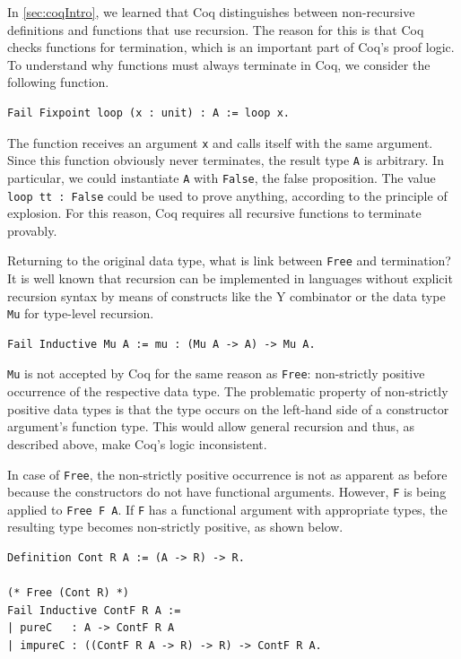 \documentclass[a4paper, 11pt, fleqn, twoside]{scrreprt}
\begin{document}
In \autoref{sec:coqIntro}, we learned that Coq distinguishes between non-recursive definitions and functions that use recursion.
The reason for this is that Coq checks functions for termination, which is an important part of Coq's proof logic.
To understand why functions must always terminate in Coq, we consider the following function.

\begin{verbatim}
Fail Fixpoint loop (x : unit) : A := loop x.
\end{verbatim}

The function receives an argument \texttt{x} and calls itself with the same argument.
Since this function obviously never terminates, the result type \texttt{A} is arbitrary.
In particular, we could instantiate \texttt{A} with \texttt{False}, the false proposition.
The value \texttt{loop tt : False} could be used to prove anything, according to the principle of explosion.
For this reason, Coq requires all recursive functions to terminate provably.

Returning to the original data type, what is link between \texttt{Free} and termination?
It is well known that recursion can be implemented in languages without explicit recursion syntax by means of constructs like the Y combinator or the data type \texttt{Mu} for type-level recursion.

\begin{verbatim}
Fail Inductive Mu A := mu : (Mu A -> A) -> Mu A.
\end{verbatim}

\texttt{Mu} is not accepted by Coq for the same reason as \texttt{Free}: non-strictly positive occurrence of the respective data type.
The problematic property of non-strictly positive data types is that the type occurs on the left-hand side of a constructor argument's function type.
This would allow general recursion and thus, as described above, make Coq's logic inconsistent.

In case of \texttt{Free}, the non-strictly positive occurrence is not as apparent as before because the constructors do not have functional arguments.
However, \texttt{F} is being applied to \texttt{Free F A}.
If \texttt{F} has a functional argument with appropriate types, the resulting type becomes non-strictly positive, as shown below.

\begin{verbatim}
Definition Cont R A := (A -> R) -> R.

(* Free (Cont R) *)
Fail Inductive ContF R A :=
| pureC   : A -> ContF R A
| impureC : ((ContF R A -> R) -> R) -> ContF R A.
\end{verbatim}
\end{document}
